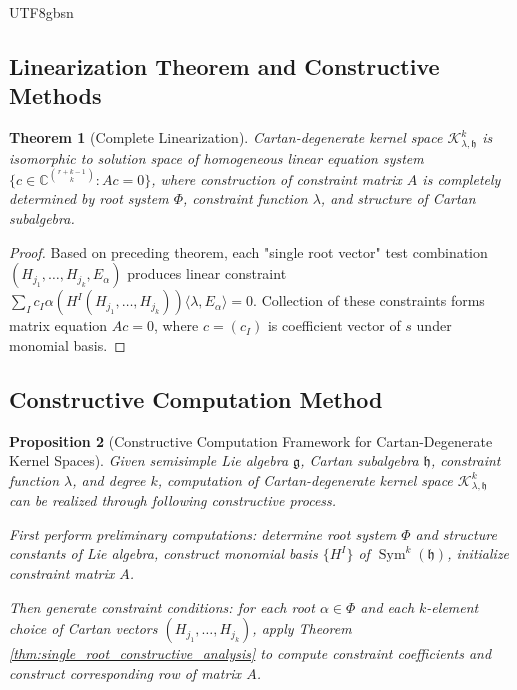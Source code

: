 \documentclass[a4paper,12pt]{extarticle}
\newtheorem{theorem}{Theorem}[section]
\newtheorem{proposition}[theorem]{Proposition}
\theoremstyle{definition}
\begin{document}
\begin{CJK}{UTF8}{gbsn}
\subsection{Linearization Theorem and Constructive Methods}
\label{subsec:linearization_constructive}

\begin{theorem}[Complete Linearization]
\label{thm:complete_linearization}
Cartan-degenerate kernel space $\mathcal{K}^k_{\lambda,\mathfrak{h}}$ is isomorphic to solution space of homogeneous linear equation system $\{c \in \mathbb{C}^{\binom{r+k-1}{k}} : Ac = 0\}$, where construction of constraint matrix $A$ is completely determined by root system $\Phi$, constraint function $\lambda$, and structure of Cartan subalgebra.
\end{theorem}

\begin{proof}
Based on preceding theorem, each "single root vector" test combination $(H_{j_1}, \ldots, H_{j_k}, E_\alpha)$ produces linear constraint $\sum_{I} c_I \alpha(H^I(H_{j_1}, \ldots, H_{j_k})) \langle \lambda, E_\alpha \rangle = 0$. Collection of these constraints forms matrix equation $Ac = 0$, where $c = (c_I)$ is coefficient vector of $s$ under monomial basis.
\end{proof}

\subsection{Constructive Computation Method}
\label{subsec:constructive_computation_method}

\begin{proposition}[Constructive Computation Framework for Cartan-Degenerate Kernel Spaces]
\label{prop:constructive_computation_framework}
Given semisimple Lie algebra $\mathfrak{g}$, Cartan subalgebra $\mathfrak{h}$, constraint function $\lambda$, and degree $k$, computation of Cartan-degenerate kernel space $\mathcal{K}^k_{\lambda,\mathfrak{h}}$ can be realized through following constructive process.

First perform preliminary computations: determine root system $\Phi$ and structure constants of Lie algebra, construct monomial basis $\{H^I\}$ of $\operatorname{Sym}^k(\mathfrak{h})$, initialize constraint matrix $A$.

Then generate constraint conditions: for each root $\alpha \in \Phi$ and each $k$-element choice of Cartan vectors $(H_{j_1}, \ldots, H_{j_k})$, apply Theorem \ref{thm:single_root_constructive_analysis} to compute constraint coefficients and construct corresponding row of matrix $A$.


\end{proposition}
\end{CJK}
\end{document}
